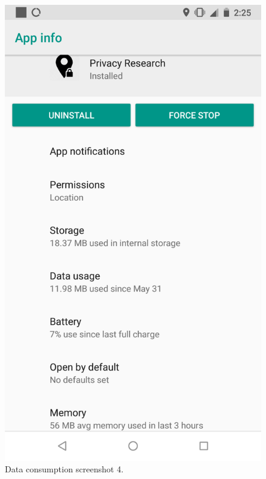 \begin{figure}
\begin{minipage}{.45\textwidth}
		\begin{center}
		\includegraphics[width=\textwidth]{data/data-usage/data-usage3.png}
		\caption{Data consumption screenshot 4.}
		\end{center}
	\end{minipage}
\end{figure}

